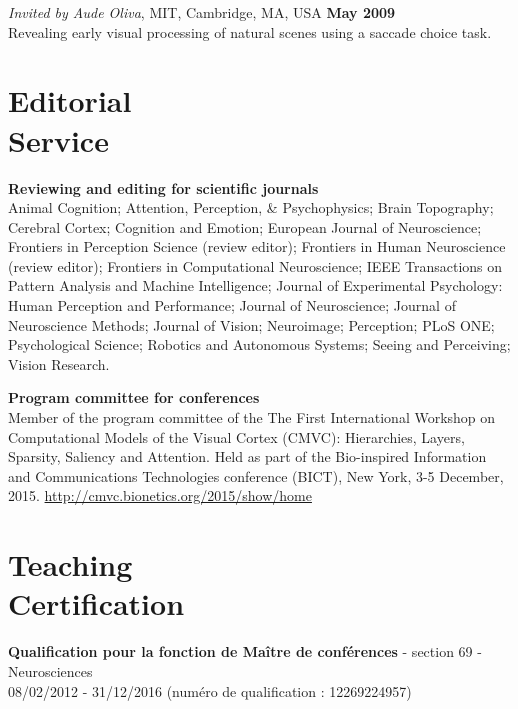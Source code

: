 \documentclass[margin,line]{resume}
\begin{document}
\begin{resume}
\vspace{-2mm} 
\textit{Invited by Aude Oliva}, MIT, Cambridge, MA, USA \hfill \textbf{May 2009}\\
Revealing early visual processing of natural scenes using a saccade choice task.

\normalsize


	\vspace{3mm}
	\section{\mysidestyle Editorial\\Service}

 \textbf{Reviewing and editing for scientific journals} \\
Animal Cognition; 
Attention, Perception, \& Psychophysics; 
Brain Topography;  
Cerebral Cortex; 
Cognition and Emotion;
European Journal of Neuroscience;
Frontiers in Perception Science (review editor); 
Frontiers in Human Neuroscience (review editor); 
Frontiers in Computational Neuroscience; 
IEEE Transactions on Pattern Analysis and Machine Intelligence;
Journal of Experimental Psychology: Human Perception and Performance;
Journal of Neuroscience;
Journal of Neuroscience Methods;
Journal of Vision;
Neuroimage;
Perception;
PLoS ONE; 
Psychological Science;
Robotics and Autonomous Systems;
Seeing and Perceiving;
Vision Research.

\newpage

\textbf{Program committee for conferences} \\
Member of the program committee of the The First International Workshop on Computational Models of the Visual Cortex (CMVC): Hierarchies, Layers, Sparsity, Saliency and Attention. Held as part of the Bio-inspired Information and Communications Technologies conference (BICT), New York, 3-5 December, 2015.
 \url{http://cmvc.bionetics.org/2015/show/home}
 

	\vspace{3mm}
	\section{\mysidestyle Teaching\\Certification}
    \textbf{Qualification pour la fonction de Maître de conférences} - section 69 - Neurosciences\\
    08/02/2012 - 31/12/2016 (numéro de qualification : 12269224957)




\end{resume}
\end{document}
